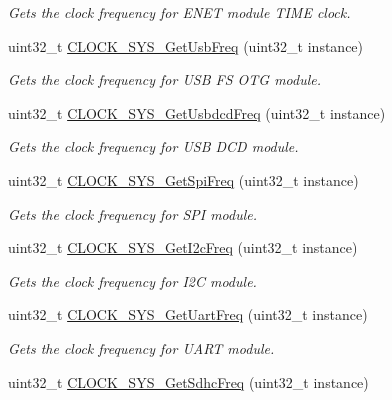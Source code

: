 \begin{DoxyCompactItemize}
\begin{DoxyCompactList}\small\item\em Gets the clock frequency for E\+N\+ET module T\+I\+ME clock. \end{DoxyCompactList}\item 
uint32\+\_\+t \hyperlink{group__clock__manager_ga4cd12328021347eb3587b9f64650ce3b}{C\+L\+O\+C\+K\+\_\+\+S\+Y\+S\+\_\+\+Get\+Usb\+Freq} (uint32\+\_\+t instance)
\begin{DoxyCompactList}\small\item\em Gets the clock frequency for U\+SB FS O\+TG module. \end{DoxyCompactList}\item 
uint32\+\_\+t \hyperlink{group__clock__manager_ga8e7148c81ee2ca92ad1ae64cc80aee17}{C\+L\+O\+C\+K\+\_\+\+S\+Y\+S\+\_\+\+Get\+Usbdcd\+Freq} (uint32\+\_\+t instance)
\begin{DoxyCompactList}\small\item\em Gets the clock frequency for U\+SB D\+CD module. \end{DoxyCompactList}\item 
uint32\+\_\+t \hyperlink{group__clock__manager_ga90b6bb1b369693a0f8d35bed91294fdd}{C\+L\+O\+C\+K\+\_\+\+S\+Y\+S\+\_\+\+Get\+Spi\+Freq} (uint32\+\_\+t instance)
\begin{DoxyCompactList}\small\item\em Gets the clock frequency for S\+PI module. \end{DoxyCompactList}\item 
uint32\+\_\+t \hyperlink{group__clock__manager_ga80d5979c64b2c120c3bb9c44429dd112}{C\+L\+O\+C\+K\+\_\+\+S\+Y\+S\+\_\+\+Get\+I2c\+Freq} (uint32\+\_\+t instance)
\begin{DoxyCompactList}\small\item\em Gets the clock frequency for I2C module. \end{DoxyCompactList}\item 
uint32\+\_\+t \hyperlink{group__clock__manager_ga7ec9f145531f74a3228047d278348a41}{C\+L\+O\+C\+K\+\_\+\+S\+Y\+S\+\_\+\+Get\+Uart\+Freq} (uint32\+\_\+t instance)
\begin{DoxyCompactList}\small\item\em Gets the clock frequency for U\+A\+RT module. \end{DoxyCompactList}\item 
uint32\+\_\+t \hyperlink{group__clock__manager_gaf4537016cb834c8670e9108d360e992d}{C\+L\+O\+C\+K\+\_\+\+S\+Y\+S\+\_\+\+Get\+Sdhc\+Freq} (uint32\+\_\+t instance)

\end{DoxyCompactItemize}
